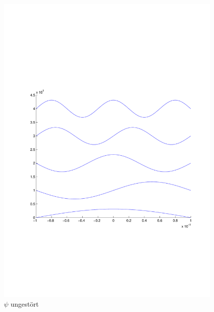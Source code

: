 \begin{refsection}
\begin{figure}
 \centering
 \includegraphics[width=12cm,clip=true,trim=2cm 7cm 1cm 8cm]{efeld/Psi_ungestoert.pdf}
 \caption{$\psi$ ungest\"ort}
 \label{abb:efeld_psi_ungestoert}
\end{figure}


\end{refsection}

